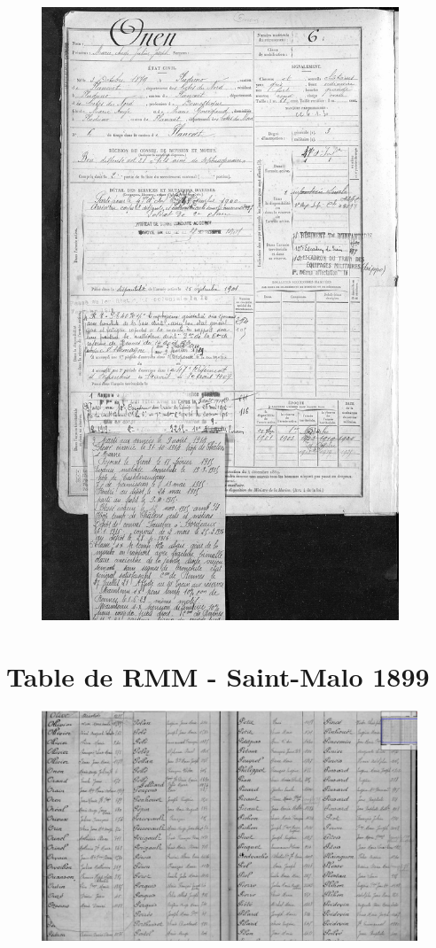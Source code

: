 \documentclass[a4paper]{article}
\begin{document}
\begin{figure}[H]
\centering
\includegraphics[width=0.95\textwidth]{RMM.JPG}
\end{figure}

\section{Table de RMM - Saint-Malo 1899}
\label{sec:annexe 2}

\begin{figure}[H]
\centering
\includegraphics[width=\textwidth]{Table_Onen.png}
\end{figure}

\newpage
\listoffigures
\end{document}
